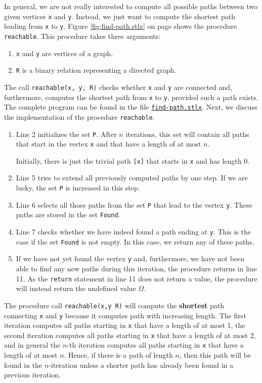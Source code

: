 In general, we are not really interested to compute all possible paths between two given vertices
\texttt{x} and \texttt{y}.  Instead, we just want to compute the shortest path leading from \texttt{x} to \texttt{y}.
Figure \ref{fig:find-path.stlx} on page \pageref{fig:find-path.stlx} shows the procedure \texttt{reachable}. 
This procedure takes three arguments:
\begin{enumerate}
\item \texttt{x} and \texttt{y} are vertices of a graph.
\item \texttt{R} is a binary relation representing a directed graph.
\end{enumerate}
The call  \texttt{reachable(x, y, R)} checks whether \texttt{x} and \texttt{y} are connected and, furthermore,
computes the shortest path from \texttt{x} to \texttt{y}, provided such a path exists.
The complete program can be found in the file
\href{https://github.com/karlstroetmann/Logik/blob/master/SetlX/find-path.stlx}{\texttt{find-path.stlx}}.
Next, we discuss the implementation of the procedure  \texttt{reachable}.
\begin{enumerate}
\item Line 2 initializes the set \texttt{P}.  After $n$ iterations, this set will contain all paths
      that start in the vertex \texttt{x} and that have a length of at most $n$.

      Initially, there is just the trivial path \texttt{[x]} that starts in \texttt{x} and has
      length $0$.
\item Line 5 tries to extend all previously computed paths by one step.
      If we are lucky, the set \texttt{P} is increased in this step.
\item Line 6 selects all those paths from the set \texttt{P} that lead to the vertex \texttt{y}.
      These paths are stored in the set \texttt{Found}.
\item Line 7 checks whether we have indeed found a path ending at \texttt{y}.  This is the case if
      the set \texttt{Found} is not empty.  
      In this case, we return any of these paths.
\item If we have not yet found the vertex \texttt{y} and, furthermore, we have not been able to find
      any new paths during this iteration,  the procedure returns in line 11.
      As the \texttt{return} statement in line 11 does not return a value, the procedure will
      instead return the undefined value $\Omega$.
\end{enumerate}
The procedure call \texttt{reachable(x,y R)} will compute the \textbf{shortest} path connecting
\texttt{x} and \texttt{y} because it computes path with increasing length.  The first iteration
computes all paths starting in \texttt{x} that have a length of at most 1, the second iteration
computes all paths starting in \texttt{x} that have a length of at most 2, and in general the $n$-th
iteration computes all paths starting in \texttt{x} that have a length of at most $n$.  Hence, if
there is a path of length $n$, then this path will be found in the $n$-iteration unless a shorter path has
already been found in a previous iteration.  

